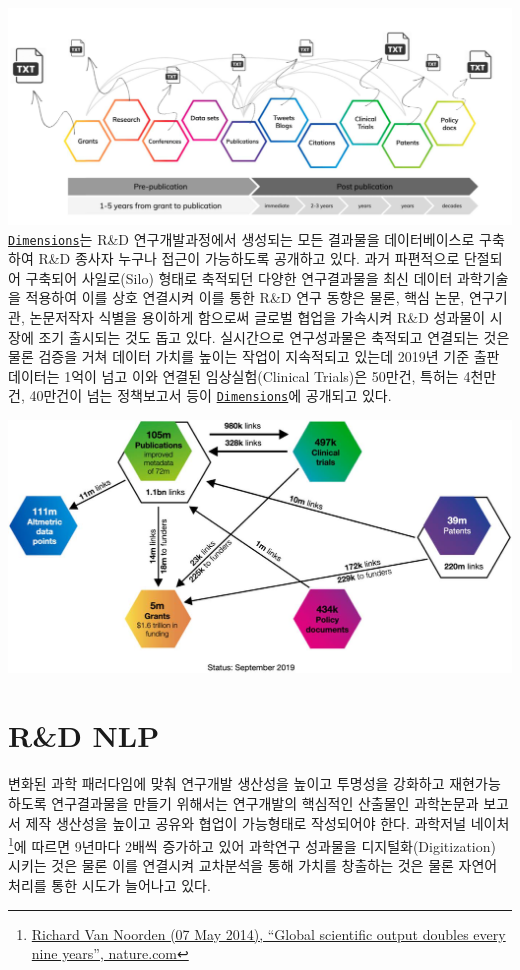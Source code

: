 \documentclass[smallextended]{svjour3}       %
\begin{document}
\includegraphics{fig/rnd-lifecycle-text.png}
\href{https://www.dimensions.ai/}{\texttt{Dimensions}}는 R\&D
연구개발과정에서 생성되는 모든 결과물을 데이터베이스로 구축하여 R\&D
종사자 누구나 접근이 가능하도록 공개하고 있다. 과거 파편적으로 단절되어
구축되어 사일로(Silo) 형태로 축적되던 다양한 연구결과물을 최신 데이터
과학기술을 적용하여 이를 상호 연결시켜 이를 통한 R\&D 연구 동향은 물론,
핵심 논문, 연구기관, 논문저작자 식별을 용이하게 함으로써 글로벌 협업을
가속시켜 R\&D 성과물이 시장에 조기 출시되는 것도 돕고 있다. 실시간으로
연구성과물은 축적되고 연결되는 것은 물론 검증을 거쳐 데이터 가치를
높이는 작업이 지속적되고 있는데 2019년 기준 출판 데이터는 1억이 넘고
이와 연결된 임상실험(Clinical Trials)은 50만건, 특허는 4천만건, 40만건이
넘는 정책보고서 등이
\href{https://www.dimensions.ai/}{\texttt{Dimensions}}에 공개되고 있다.

\includegraphics{fig/rnd-dimensions-ai.png}

\hypertarget{rd-nlp}{%
\section{R\&D NLP}\label{rd-nlp}}

변화된 과학 패러다임에 맞춰 연구개발 생산성을 높이고 투명성을 강화하고
재현가능하도록 연구결과물을 만들기 위해서는 연구개발의 핵심적인 산출물인
과학논문과 보고서 제작 생산성을 높이고 공유와 협업이 가능형태로
작성되어야 한다. 과학저널 네이처\footnote{\href{http://blogs.nature.com/news/2014/05/global-scientific-output-doubles-every-nine-years.html}{Richard
  Van Noorden (07 May 2014), ``Global scientific output doubles every
  nine years'', nature.com}}에 따르면 9년마다 2배씩 증가하고 있어
과학연구 성과물을 디지털화(Digitization) 시키는 것은 물론 이를 연결시켜
교차분석을 통해 가치를 창출하는 것은 물론 자연어 처리를 통한 시도가
늘어나고 있다.
\end{document}
